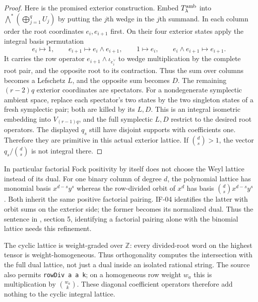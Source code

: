 \documentclass[11pt,a4paper]{article}
\theoremstyle{definition}
\theoremstyle{remark}
\begin{document}
\begin{proof}
Here is the promised exterior construction. Embed
$T^{\rm amb}_\lambda$ into
$\bigwedge^*(\bigoplus_{j=1}^q U_j)$ by putting the $j$th wedge in the
$j$th summand. In each column order the root coordinates $e_i,e_{i+1}$
first. On their four exterior states apply the integral basis
permutation
\[
 e_i\mapsto1,\qquad e_{i+1}\mapsto e_i\wedge e_{i+1},\qquad
 1\mapsto e_i,\qquad e_i\wedge e_{i+1}\mapsto e_{i+1}.
\]
It carries the row operator $e_{i+1}\wedge\iota_{e_i^\vee}$ to wedge
multiplication by the complete root pair, and the opposite root to its
contraction. Thus the sum over columns becomes a Lefschetz $L$, and the
opposite sum becomes $D$. The remaining $(r-2)q$ exterior coordinates
are spectators. For a nondegenerate symplectic ambient space, replace
each spectator's two states by the two singleton states of a fresh
symplectic pair; both are killed by its $L,D$. This is an integral
isometric embedding into $V_{(r-1)q}$, and the full symplectic $L,D$
restrict to the desired root operators. The displayed $q_s$ still have
disjoint supports with coefficients one. Therefore they are primitive
in this actual exterior lattice. If $\binom ds>1$, the vector
$q_s/\binom ds$ is not integral there.
\end{proof}

In particular factorial Fock positivity by itself does not choose the
Weyl lattice instead of its dual. For one binary column of degree $d$,
the polynomial lattice has monomial basis $x^{d-s}y^s$ whereas the
row-divided orbit of $x^d$ has basis
$\binom ds x^{d-s}y^s$. Both inherit the same positive factorial
pairing. IF-04 identifies the latter with orbit sums on the exterior
side; the former becomes its normalized dual. Thus the sentence in
, section 5, identifying a
factorial pairing alone with the binomial lattice needs this refinement.

The cyclic lattice is weight-graded over $\mathbb Z$: every divided-root
word on the highest tensor is weight-homogeneous. Thus orthogonality
computes the intersection with the full dual lattice, not just a dual
inside an isolated rational string. The source also permits
\texttt{rowDiv a a k}; on a homogeneous row weight $w_a$ this is
multiplication by $\binom{w_a}{k}$. These diagonal coefficient
operators therefore add nothing to the cyclic integral lattice.
\end{document}
